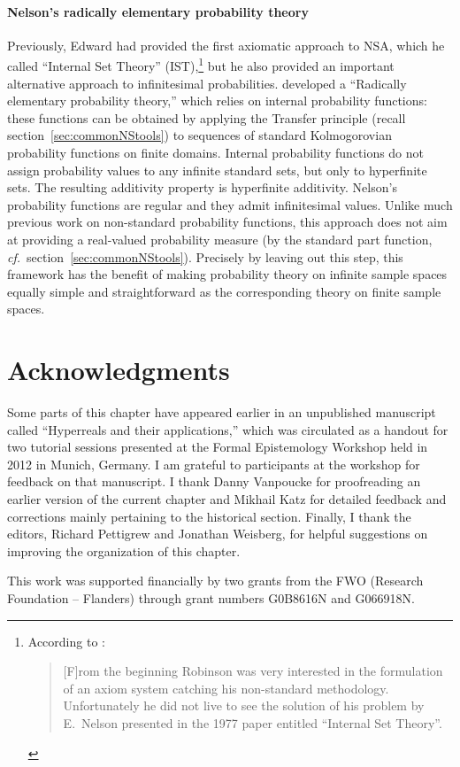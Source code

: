 \paragraph{Nelson's radically elementary probability theory}
Previously, Edward \citet{Nelson:1977} had provided the first axiomatic approach to NSA, which he called ``Internal Set Theory'' (IST),\footnote{According to \citet[p.~xi]{Luxemburg:2007}:
\begin{quote}
[F]rom the beginning Robinson was very interested in the formulation of an axiom system catching his non-standard methodology. Unfortunately he did not live to see the solution of his problem by E.~Nelson presented in the 1977 paper entitled ``Internal Set Theory''.
\end{quote}}
but he also provided an important alternative approach to infinitesimal probabilities. \citet{Nelson:1987} developed a ``Radically elementary probability theory,'' which relies on internal probability functions: these functions can be obtained by applying the Transfer principle (recall section~\ref{sec:commonNStools}) to sequences of standard Kolmogorovian probability functions on finite domains. Internal probability functions do not assign probability values to any infinite standard sets, but only to hyperfinite sets. The resulting additivity property is hyperfinite additivity.
Nelson's probability functions are regular and they admit infinitesimal values. Unlike much previous work on non-standard probability functions, this approach does not aim at providing a real-valued probability measure (by the standard part function, \textit{cf.}\ section~\ref{sec:commonNStools}). Precisely by leaving out this step, this framework has the benefit of making probability theory on infinite sample spaces equally simple and straightforward as the corresponding theory on finite sample spaces.

\section*{Acknowledgments}
Some parts of this chapter have appeared earlier in an un\-pub\-lished man\-u\-script called ``Hyperreals and their applications,'' which was circulated as a handout for two tutorial sessions presented at the Formal Epistemology Workshop held in 2012 in Munich, Germany. I am grateful to participants at the workshop for feedback on that manuscript.
I thank Danny Vanpoucke for proofreading an earlier version of the current chapter and Mikhail Katz for detailed feedback and corrections mainly pertaining to the historical section. Finally, I thank the editors, Richard Pettigrew and Jonathan Weisberg, for helpful suggestions on improving the organization of this chapter.

This work was supported financially by two grants from the FWO (Research Foundation -- Flanders) through grant numbers G0B8616N and G066918N.